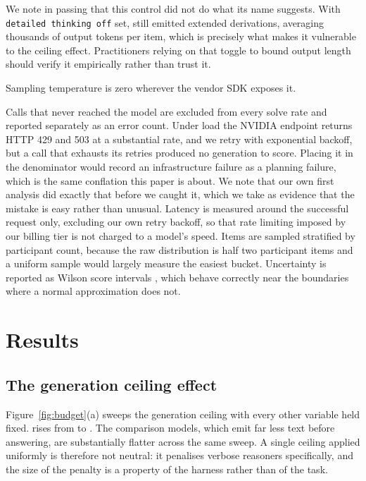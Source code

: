 \documentclass[10pt,twocolumn]{article}
\begin{document}
We note in passing that this control did not do what its name suggests. With
\texttt{detailed thinking off} set, \nemotronName{} still emitted extended
derivations, averaging thousands of output tokens per item, which is precisely
what makes it vulnerable to the ceiling effect. Practitioners relying on that
toggle to bound output length should verify it empirically rather than trust it.

Sampling temperature is zero wherever the vendor SDK exposes it.

Calls that never reached the model are excluded from every solve rate and
reported separately as an error count. Under load the NVIDIA endpoint returns
HTTP 429 and 503 at a substantial rate, and we retry with exponential backoff,
but a call that exhausts its retries produced no generation to score. Placing it
in the denominator would record an infrastructure failure as a planning failure,
which is the same conflation this paper is about. We note that our own first
analysis did exactly that before we caught it, which we take as evidence that
the mistake is easy rather than unusual. Latency is measured around the successful request only, excluding our own
retry backoff, so that rate limiting imposed by our billing tier is not charged
to a model's speed. Items are sampled stratified by participant count, because
the raw distribution is half two participant items and a uniform sample would
largely measure the easiest bucket. Uncertainty is reported as Wilson score
intervals \cite{wilson1927probable}, which behave correctly near the boundaries
where a normal approximation does not.

\section{Results}

\subsection{The generation ceiling effect}
Figure~\ref{fig:budget}(a) sweeps the generation ceiling with every other
variable held fixed. \nemotronName{} rises from \nemotronLowAcc{} to
\nemotronHighAcc{}. The comparison models, which emit far less text before
answering, are substantially flatter across the same sweep. A single ceiling
applied uniformly is therefore not neutral: it penalises verbose reasoners
specifically, and the size of the penalty is a property of the harness rather
than of the task.
\end{document}

